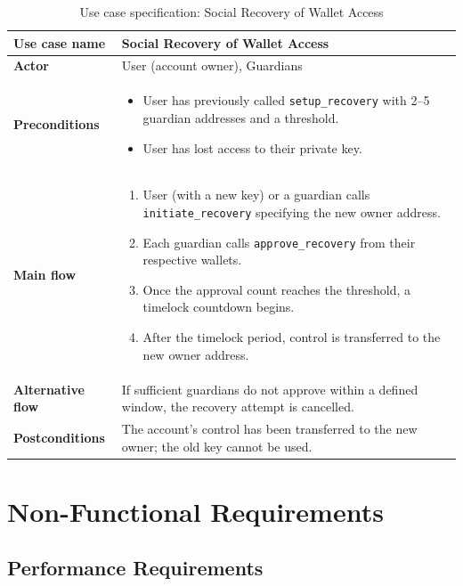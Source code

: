 \begin{table}[H]
\centering
\caption{Use case specification: Social Recovery of Wallet Access}
\label{table:uc07}
\begin{tabular}{|l|p{10cm}|}
\hline
\textbf{Use case name} & Social Recovery of Wallet Access \\ \hline
\textbf{Actor} & User (account owner), Guardians \\ \hline
\textbf{Preconditions} & \begin{itemize}[noitemsep]
    \item User has previously called \texttt{setup\_recovery} with 2--5 guardian addresses and a threshold.
    \item User has lost access to their private key.
\end{itemize} \\ \hline
\textbf{Main flow} & \begin{enumerate}[noitemsep]
    \item User (with a new key) or a guardian calls \texttt{initiate\_recovery} specifying the new owner address.
    \item Each guardian calls \texttt{approve\_recovery} from their respective wallets.
    \item Once the approval count reaches the threshold, a timelock countdown begins.
    \item After the timelock period, control is transferred to the new owner address.
\end{enumerate} \\ \hline
\textbf{Alternative flow} & If sufficient guardians do not approve within a defined window, the recovery attempt is cancelled. \\ \hline
\textbf{Postconditions} & The account's control has been transferred to the new owner; the old key cannot be used. \\ \hline
\end{tabular}
\end{table}

\section{Non-Functional Requirements}
\label{section:2.4}

\subsection{Performance Requirements}

